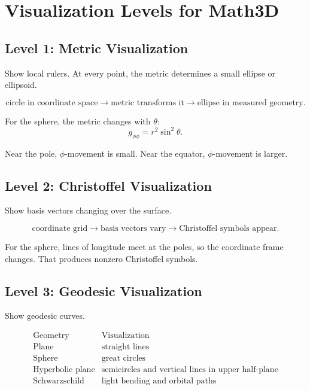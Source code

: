 \documentclass[12pt,a4paper]{article}
\theoremstyle{notespace}
\begin{document}
\section{Visualization Levels for Math3D}

\subsection{Level 1: Metric Visualization}

Show local rulers. At every point, the metric determines a small ellipse or ellipsoid.

\[
\text{circle in coordinate space}
\longrightarrow
\text{metric transforms it}
\longrightarrow
\text{ellipse in measured geometry}.
\]

For the sphere, the metric changes with \(\theta\):
\[
g_{\phi\phi}=r^2\sin^2\theta.
\]

Near the pole, \(\phi\)-movement is small. Near the equator, \(\phi\)-movement is larger.

\subsection{Level 2: Christoffel Visualization}

Show basis vectors changing over the surface.

\[
\text{coordinate grid}
\longrightarrow
\text{basis vectors vary}
\longrightarrow
\text{Christoffel symbols appear}.
\]

For the sphere, lines of longitude meet at the poles, so the coordinate frame changes. That produces nonzero Christoffel symbols.

\subsection{Level 3: Geodesic Visualization}

Show geodesic curves.

\[
\begin{array}{c|c}
	\text{Geometry} & \text{Visualization}\\
	\hline
	\text{Plane} & \text{straight lines}\\
	\text{Sphere} & \text{great circles}\\
	\text{Hyperbolic plane} & \text{semicircles and vertical lines in upper half-plane}\\
	\text{Schwarzschild} & \text{light bending and orbital paths}
\end{array}
\]
\end{document}
